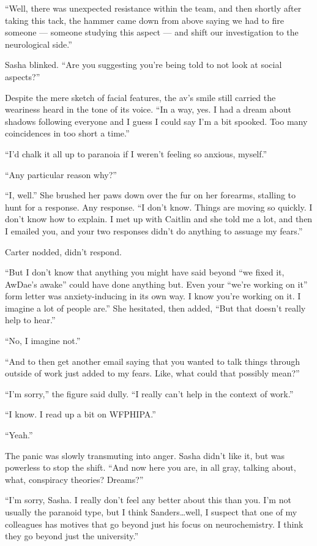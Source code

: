 ``Well, there was unexpected resistance within the team, and then shortly after taking this tack, the hammer came down from above saying we had to fire someone — someone studying this aspect — and shift our investigation to the neurological side.''

Sasha blinked. ``Are you suggesting you're being told to not look at social aspects?''

Despite the mere sketch of facial features, the av's smile still carried the weariness heard in the tone of its voice. ``In a way, yes. I had a dream about shadows following everyone and I guess I could say I'm a bit spooked. Too many coincidences in too short a time.''

``I'd chalk it all up to paranoia if I weren't feeling so anxious, myself.''

``Any particular reason why?''

``I, well.'' She brushed her paws down over the fur on her forearms, stalling to hunt for a response. Any response. ``I don't know. Things are moving so quickly. I don't know how to explain. I met up with Caitlin and she told me a lot, and then I emailed you, and your two responses didn't do anything to assuage my fears.''

Carter nodded, didn't respond.

``But I don't know that anything you might have said beyond ``we fixed it, AwDae's awake'' could have done anything but. Even your ``we're working on it'' form letter was anxiety-inducing in its own way. I know you're working on it. I imagine a lot of people are.'' She hesitated, then added, ``But that doesn't really help to hear.''

``No, I imagine not.''

``And to then get another email saying that you wanted to talk things through outside of work just added to my fears. Like, what could that possibly mean?''

``I'm sorry,'' the figure said dully. ``I really can't help in the context of work.''

``I know. I read up a bit on WFPHIPA.''

``Yeah.''

The panic was slowly transmuting into anger. Sasha didn't like it, but was powerless to stop the shift. ``And now here you are, in all gray, talking about, what, conspiracy theories? Dreams?''

``I'm sorry, Sasha. I really don't feel any better about this than you. I'm not usually the paranoid type, but I think Sanders\ldots{}well, I suspect that one of my colleagues has motives that go beyond just his focus on neurochemistry. I think they go beyond just the university.''

